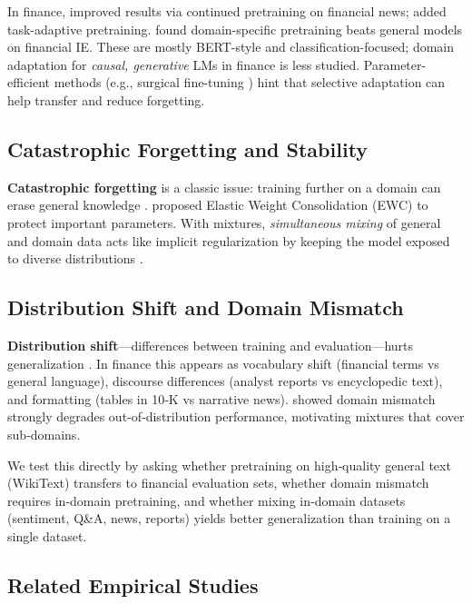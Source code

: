 In finance, \textcite{araci2019finbert} improved results via continued pretraining on financial news; \textcite{yang2020finbert} added task-adaptive pretraining. \textcite{huang2023finbert} found domain-specific pretraining beats general models on financial IE. These are mostly BERT-style and classification-focused; domain adaptation for \textit{causal, generative} LMs in finance is less studied. Parameter-efficient methods (e.g., surgical fine-tuning \parencite{lee2022surgical}) hint that selective adaptation can help transfer and reduce forgetting.

\subsection{Catastrophic Forgetting and Stability}

\textbf{Catastrophic forgetting} is a classic issue: training further on a domain can erase general knowledge \parencite{mccloskey1989catastrophic, french1999catastrophic}. \textcite{kirkpatrick2017overcoming} proposed Elastic Weight Consolidation (EWC) to protect important parameters. With mixtures, \textit{simultaneous mixing} of general and domain data acts like implicit regularization by keeping the model exposed to diverse distributions \parencite{arivazhagan2019massively,raffel2020exploring}.

\subsection{Distribution Shift and Domain Mismatch}

\textbf{Distribution shift}—differences between training and evaluation—hurts generalization \parencite{quinonero2009dataset}. In finance this appears as vocabulary shift (financial terms vs general language), discourse differences (analyst reports vs encyclopedic text), and formatting (tables in 10‑K vs narrative news). \textcite{aharoni2020unsupervised} showed domain mismatch strongly degrades out‑of‑distribution performance, motivating mixtures that cover sub‑domains.

We test this directly by asking whether pretraining on high‑quality general text (WikiText) transfers to financial evaluation sets, whether domain mismatch requires in‑domain pretraining, and whether mixing in‑domain datasets (sentiment, Q\&A, news, reports) yields better generalization than training on a single dataset.

\subsection{Related Empirical Studies}

